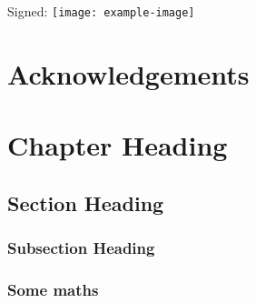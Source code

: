 \documentclass[11pt, a4paper]{report}
\begin{document}
\vspace{2cm}
Signed: \hspace{1cm} \texttt{[image: example-image]} %

\chapter*{Acknowledgements}
\lipsum[3]

\setcounter{tocdepth}{2}
\tableofcontents
\listoffigures
\listoftables
\lstlistoflistings    %

\newpage
\setcounter{page}{0}

\chapter{Chapter Heading} %
\label{cha:chapter label} %

\lipsum[1]  %

\section{Section Heading} %
\label{sec:section label} %

\lipsum[2]  %
 
\subsection{Subsection Heading} %
\label{sec:subsection label} %

\lipsum[3]  %

\subsection{Some maths}
\end{document}
